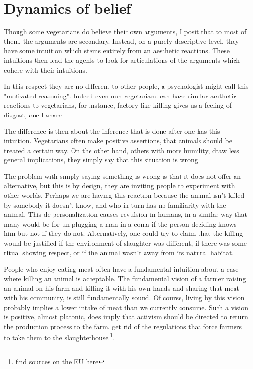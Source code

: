 \section{Dynamics of belief}

Though some vegetarians do believe their own arguments, I posit that to most of them, the arguments are secondary. Instead, on a purely descriptive level, they have some intuition which stems entirely from an aesthetic reactions. These intuitions then lead the agents to look for articulations of the arguments which cohere with their intuitions. 

In this respect they are no different to other people, a psychologist might call this "motivated reasoning". Indeed even non-vegetarians can have similar aesthetic reactions to vegetarians, for instance, factory like killing gives us a feeling of disgust, one I share. 

The difference is then about the inference that is done after one has this intuition. Vegetarians often make positive assertions, that animals should be treated a certain way. On the other hand, others with more humility, draw less general implications, they simply say that this situation is wrong. 

The problem with simply saying something is wrong is that it does not offer an alternative, but this is by design, they are inviting people to experiment with other worlds. Perhaps we are having this reaction because the animal isn't killed by somebody it doesn't know, and who in turn has no familiarity with the animal. This de-personalization causes revulsion in humans, in a similar way that many would be for un-plugging a man in a coma if the person deciding knows him but not if they do not. Alternatively, one could try to claim that the killing would be justified if the environment of slaughter was different, if there was some ritual showing respect, or if the animal wasn't away from its natural habitat. 

People who enjoy eating meat often have a fundamental intuition about a case where killing an animal is acceptable. The fundamental vision of a farmer raising an animal on his farm and killing it with his own hands and sharing that meat with his community, is still fundamentally sound. Of course, living by this vision probably implies a lower intake of meat than we currently consume. Such a vision is positive, almost platonic, does imply that activism should be directed to return the production process to the farm, get rid of the regulations that force farmers to take them to the slaughterhouse.\footnote{find sources on the EU here}. 

